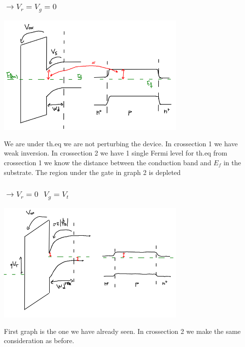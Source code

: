 \subsubsection{$\rightarrow V_r=V_g=0$}

\centering
\includegraphics[width=0.7\textwidth]{theqmosr.png}\\
\raggedright

We are under th.eq we are not perturbing the device. In crossection 1 we have weak inversion. In crossection 2 we have 1 single Fermi level for th.eq from crossection 1 we know the distance between the conduction band and $E_f$ in the substrate. The region under the gate in graph 2 is depleted


\subsubsection{$\rightarrow V_r=0 \ \ \  V_g=V_t$}

\centering
\includegraphics[width=0.7\textwidth]{what1.png}\\
\raggedright

First graph is the one we have already seen. In crossection 2 we make the same consideration as before.


